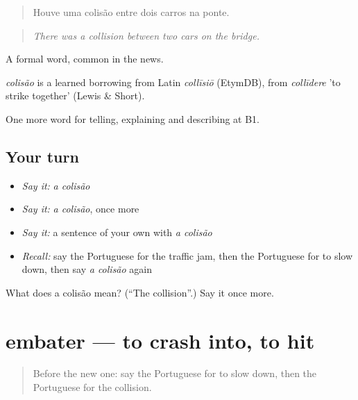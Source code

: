 \begin{quote}
Houve uma colisão entre dois carros na ponte.
\end{quote}

\begin{quote}
\emph{There was a collision between two cars on the bridge.}
\end{quote}

A formal word, common in the news.

\begin{cousinweb}
\emph{colisão} is a learned borrowing from Latin \emph{collīsiō} (EtymDB), from \emph{collīdere} 'to strike together' (Lewis \& Short).
\end{cousinweb}

\begin{grammarlens}[title={What you've built}]
One more word for telling, explaining and describing at B1.
\end{grammarlens}

\subsection*{Your turn}
\begin{itemize}
\raggedright
  \item \emph{Say it:} \emph{a colisão}
  \item \emph{Say it:} \emph{a colisão}, once more
  \item \emph{Say it:} a sentence of your own with \emph{a colisão}
  \item \emph{Recall:} say the Portuguese for the traffic jam, then the Portuguese for to slow down, then say \emph{a colisão} again
\end{itemize}

\begin{tcolorbox}[breakable,colback=teal!4,colframe=teal!35!black,title={Before you move on}]
What does a colisão mean? (\textquotedblleft{}The collision\textquotedblright{}.) Say it once more.
\end{tcolorbox}
\section[embater]{embater — to crash into, to hit}

\label{lesson:PT-C409-embater}



\begin{quote}
Before the new one: say the Portuguese for to slow down, then the Portuguese for the collision.
\end{quote}

